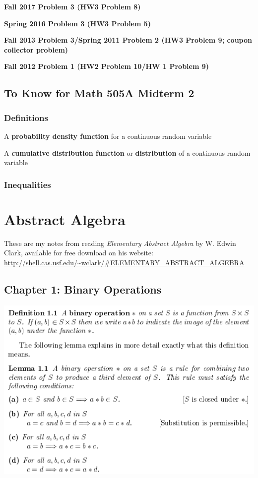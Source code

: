 \documentclass{article}
\begin{document}
\textbf{Fall 2017 Problem 3 (HW3 Problem 8)}

\textbf{Spring 2016 Problem 3 (HW3 Problem 5)}

\textbf{Fall 2013 Problem 3/Spring 2011 Problem 2 (HW3 Problem 9; coupon collector problem)}

\textbf{Fall 2012 Problem 1 (HW2 Problem 10/HW 1 Problem 9)}

\subsection{To Know for Math 505A Midterm 2}

\subsubsection{Definitions}

A \textbf{probability density function} for a continuous random variable 

A \textbf{cumulative distribution function} or \textbf{distribution} of a continuous random variable

\subsubsection{Inequalities}

\pagebreak


\section{Abstract Algebra}

These are my notes from reading \textit{Elementary Abstract Algebra} by W. Edwin Clark, available for free download on his website: \url{http://shell.cas.usf.edu/~wclark/#ELEMENTARY_ABSTRACT_ALGEBRA}

\subsection{Chapter 1: Binary Operations}

\includegraphics[scale=0.65]{binary_operation}
\end{document}
